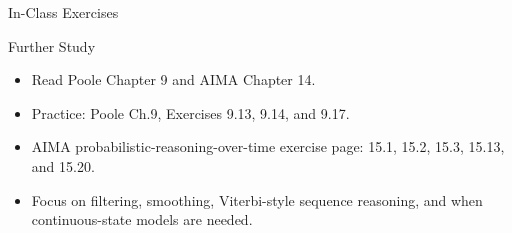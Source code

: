 \documentclass[aspectratio=169]{beamer}
\begin{document}
\begin{frame}{In-Class Exercises}
\end{frame}

\begin{frame}{Further Study}
\begin{itemize}
  \item Read Poole Chapter 9 and AIMA Chapter 14.
  \item Practice: Poole Ch.9, Exercises 9.13, 9.14, and 9.17.
  \item AIMA probabilistic-reasoning-over-time exercise page: 15.1, 15.2, 15.3, 15.13, and 15.20.
  \item Focus on filtering, smoothing, Viterbi-style sequence reasoning, and when continuous-state models are needed.
\end{itemize}
\end{frame}
\end{document}
